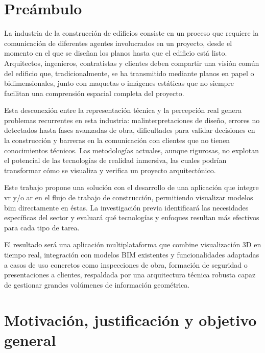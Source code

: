 
\chapter*{Preámbulo}
\thispagestyle{empty}
    La industria de la construcción de edificios consiste en un proceso que requiere la comunicación de diferentes agentes involucrados en un proyecto, desde el momento en el que se diseñan los planos hasta que el edificio está listo. Arquitectos, ingenieros, contratistas y clientes deben compartir una visión común del edificio que, tradicionalmente, se ha transmitido mediante planos en papel o bidimensionales, junto con maquetas o imágenes estáticas que no siempre facilitan una comprensión espacial completa del proyecto.

    Esta desconexión entre la representación técnica y la percepción real genera problemas recurrentes en esta industria: malinterpretaciones de diseño, errores no detectados hasta fases avanzadas de obra, dificultades para validar decisiones en la construcción y barreras en la comunicación con clientes que no tienen conocimientos técnicos. Las metodologías actuales, aunque rigurosas, no explotan el potencial de las tecnologías de realidad inmersiva, las cuales podrían transformar cómo se visualiza y verifica un proyecto arquitectónico.

    Este trabajo propone una solución con el desarrollo de una aplicación que integre \gls{vr} y/o \gls{ar} en el flujo de trabajo de construcción, permitiendo visualizar modelos \gls{bim} directamente en éstas. La investigación previa identificará las necesidades específicas del sector y evaluará qué tecnologías y enfoques resultan más efectivos para cada tipo de tarea.

    El resultado será una aplicación multiplataforma que combine visualización 3D en tiempo real, integración con modelos BIM existentes y funcionalidades adaptadas a casos de uso concretos como inspecciones de obra, formación de seguridad o presentaciones a clientes, respaldada por una arquitectura técnica robusta capaz de gestionar grandes volúmenes de información geométrica.


\chapter*{Motivación, justificación y objetivo general}


